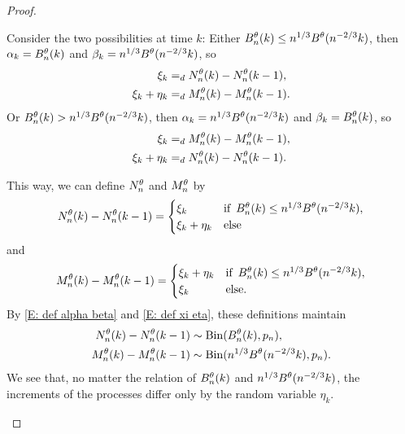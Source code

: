 \begin{proof}
\begin{proofpart}
Consider the two possibilities at time $k$:
Either $B_n^{\theta}(k) \leq n^{1 / 3}B^{\theta}(n^{-2 / 3}k)$,
then $\alpha_k = B_n^{\theta}(k)$ and $\beta_k = n^{1 / 3}B^{\theta}(n^{-2 / 3}k)$, 
so 
\begin{equation}
\begin{aligned}
\xi_k &=_d N_n^{\theta}(k) - N_n^{\theta}(k-1), \\
\xi_k + \eta_k &=_d M_n^{\theta}(k) - M_n^{\theta}(k-1).
\end{aligned}
\end{equation}
Or $B_n^{\theta}(k) > n^{1 / 3}B^{\theta}(n^{-2 / 3}k)$,
then $\alpha_k = n^{1 / 3}B^{\theta}(n^{-2 / 3}k)$ and $\beta_k = B_n^{\theta}(k)$, 
so
\begin{equation}
\begin{aligned}
\xi_k &=_d M_n^{\theta}(k) - M_n^{\theta}(k-1), \\
\xi_k + \eta_k &=_d N_n^{\theta}(k) - N_n^{\theta}(k-1).
\end{aligned}
\end{equation}

This way, we can define $N_n^{\theta}$ and $M_n^{\theta}$ by
\begin{equation}
N_n^{\theta}(k) - N_n^{\theta}(k-1) = 
\begin{cases}
\xi_k & \text{if} \enspace B_n^{\theta}(k) \leq n^{1 / 3}B^{\theta}(n^{-2 / 3}k), \\
\xi_k + \eta_k &\text{else}
\end{cases}
\end{equation}
and
\begin{equation}
M_n^{\theta}(k) - M_n^{\theta}(k-1) = 
\begin{cases}
\xi_k + \eta_k & \text{if} \enspace B_n^{\theta}(k) \leq n^{1 / 3}B^{\theta}(n^{-2 / 3}k), \\
\xi_k &\text{else}.
\end{cases}
\end{equation}
By \eqref{E: def alpha beta} and \eqref{E: def xi eta},
these definitions maintain
\begin{equation*}
\begin{aligned}
N_n^{\theta}(k) - N_n^{\theta}(k-1) &\sim \operatorname*{Bin}(B_n^{\theta}(k), p_n), \\
M_n^{\theta}(k) - M_n^{\theta}(k-1) &\sim \operatorname*{Bin}(n^{1 / 3} B^{\theta}(n^{-2 / 3}k), p_n).
\end{aligned}
\end{equation*}
We see that, no matter the relation of $B_n^{\theta}(k)$ and $n^{1 / 3}B^{\theta}(n^{-2 / 3}k)$, 
the increments of the processes differ only by the random variable $\eta_k$.


\end{proofpart}
\end{proof}
